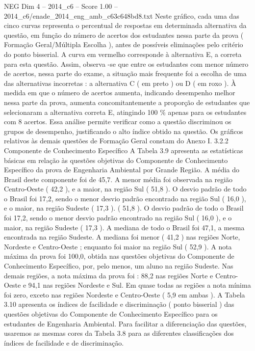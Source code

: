 \begin{textsample}{NEG Dim 4 – 2014\_c6 – Score 1.00 – 2014\_c6/enade\_2014\_eng\_amb\_c63c648bd8.txt}
Neste gráfico, cada uma das cinco curvas representa o percentual de respostas em determinada alternativa da questão, em função do número de acertos dos estudantes nessa parte da prova ( Formação Geral/Múltipla Escolha ), antes de possíveis eliminações pelo critério do ponto bisserial.
A curva em vermelho corresponde à alternativa E, a correta para esta questão.
Assim, observa -se que entre os estudantes com menor número de acertos, nessa parte do exame, a situação mais frequente foi a escolha de uma das alternativas incorretas : a alternativa C ( em preto ) ou D ( em roxo ).
À medida em que o número de acertos aumenta, indicando desempenho melhor nessa parte da prova, aumenta concomitantemente a proporção de estudantes que selecionaram a alternativa correta E, atingindo 100 \% apenas para os estudantes com 8 acertos.
Essa análise permite verificar como a questão discriminou os grupos de desempenho, justificando o alto índice obtido na questão.
Os gráficos relativos às demais questões de Formação Geral constam do Anexo I. 3.2.2 Componente de Conhecimento Específico A Tabela 3.9 apresenta as estatísticas básicas em relação às questões objetivas do Componente de Conhecimento Específico da prova de Engenharia Ambiental por Grande Região.
A média do Brasil deste componente foi de 45,7.
A menor média foi observada na região Centro-Oeste ( 42,2 ), e a maior, na região Sul ( 51,8 ).
O desvio padrão de todo o Brasil foi 17,2, sendo o menor desvio padrão encontrado na região Sul ( 16,0 ), e o maior, na região Sudeste ( 17,3 ). ( 51,8 ).
O desvio padrão de todo o Brasil foi 17,2, sendo o menor desvio padrão encontrado na região Sul ( 16,0 ), e o maior, na região Sudeste ( 17,3 ).
A mediana de todo o Brasil foi 47,1, a mesma encontrada na região Sudeste.
A mediana foi menor ( 41,2 ) nas regiões Norte, Nordeste e Centro-Oeste ; enquanto foi maior na região Sul ( 52,9 ).
A nota máxima da prova foi 100,0, obtida nas questões objetivas do Componente de Conhecimento Específico, por, pelo menos, um aluno na região Sudeste.
Nas demais regiões, a nota máxima da prova foi : 88,2 nas regiões Norte e Centro-Oeste e 94,1 nas regiões Nordeste e Sul.
Em quase todas as regiões a nota mínima foi zero, exceto nas regiões Nordeste e Centro-Oeste ( 5,9 em ambas ).
A Tabela 3.10 apresenta os índices de facilidade e discriminação ( ponto bisserial ) das questões objetivas do Componente de Conhecimento Específico para os estudantes de Engenharia Ambiental.
Para facilitar a diferenciação das questões, usaremos as mesmas cores da Tabela 3.8 para as diferentes classificações dos índices de facilidade e de discriminação.

\end{textsample}
